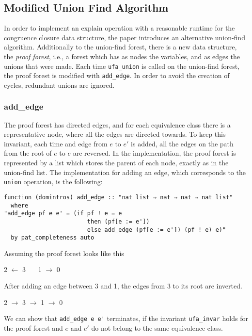\subsection{Modified Union Find Algorithm}

In order to implement an explain operation with a reasonable runtime for the congruence closure data structure, the paper \cite{Nieuwenhuis} introduces an alternative union-find algorithm. Additionally to the union-find forest, there is a new data structure, the \emph{proof forest}, i.e., a forest which has as nodes the variables, and as edges the unions that were made. Each time \lstinline{ufa_union} is called on the union-find forest, the proof forest is modified with \lstinline{add_edge}. In order to avoid the creation of cycles, redundant unions are ignored.

\subsubsection{add\_edge}
\label{subsubsection:addedge}

The proof forest has directed edges, and for each equivalence class there is a representative node, where all the edges are directed towards. To keep this invariant, each time and edge from $e$ to $e'$ is added, all the edges on the path from the root of $e$ to $e$ are reversed.
In the implementation, the proof forest is represented by a list which stores the parent of each node, exactly as in the union-find list. The implementation for adding an edge, which corresponds to the \lstinline{union} operation, is the following:

\begin{lstlisting}
function (domintros) add_edge :: "nat list ⇒ nat ⇒ nat ⇒ nat list"
  where
"add_edge pf e e' = (if pf ! e = e
                        then (pf[e := e'])
                        else add_edge (pf[e := e']) (pf ! e) e)"
  by pat_completeness auto
\end{lstlisting}

\begin{exmp}
Assuming the proof forest looks like this

2 $\longleftarrow$ 3 \ \ \ 1 $\longrightarrow$ 0 \

After adding an edge between 3 and 1, the edges from 3 to its root are inverted.

2 $\longrightarrow$ 3 $\longrightarrow$ 1 $\longrightarrow$ 0 \
\end{exmp}

We can show that \lstinline{add_edge e e'} terminates, if the invariant \lstinline{ufa_invar} holds for the proof forest and $e$ and $e'$ do not belong to the same equivalence class.

